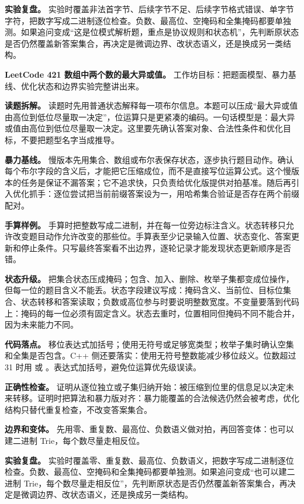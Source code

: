 \textbf{实验复盘。} 实验时覆盖非法首字节、后续字节不足、后续字节格式错误、单字节字符，把数字写成二进制逐位检查。负数、最高位、空掩码和全集掩码都要单独测。如果追问变成“这是位模式解析题，重点是协议规则和状态机”，先判断原状态是否仍然覆盖新答案集合，再决定是微调边界、改状态语义，还是换成另一类结构。

\noindent\textbf{LeetCode 421 数组中两个数的最大异或值。} 工作坊目标：把题面模型、暴力基线、优化状态和边界实验完整讲出来。

\textbf{读题拆解。} 读题时先用普通状态解释每一项布尔信息。本题可以压成“最大异或值由高位到低位尽量取一决定”，位运算只是更紧凑的编码。一句话模型是：最大异或值由高位到低位尽量取一决定。这里要先确认答案对象、合法性条件和优化目标，不要把题型名字当成推导。

\textbf{暴力基线。} 慢版本先用集合、数组或布尔表保存状态，逐步执行题目动作。确认每个布尔字段的含义后，才能把它压缩成位，而不是直接写位运算公式。这个慢版本的任务是保证不漏答案；它不追求快，只负责给优化版提供对拍基准。随后再引入优化抓手：逐位尝试把当前前缀答案设为一，用哈希集合验证是否存在两个前缀配对。

\textbf{手算样例。} 手算时把整数写成二进制，并在每一位旁边标注含义。状态转移只允许改变题目动作允许改变的那些位。手算表至少记录输入位置、状态变化、答案更新和停止条件。只写最终答案看不出边界，逐轮记录才能发现状态更新顺序是否错。

\textbf{状态升级。} 把集合状态压成掩码；包含、加入、删除、枚举子集都变成位操作，但每一位的题目含义不能丢。状态字段建议写成：掩码含义、当前位、目标位集合、状态转移和答案读取；负数或高位参与时要说明整数宽度。不变量要落到代码上：掩码的每一位必须有固定含义。状态去重时，位置相同但掩码不同不能合并，因为未来能力不同。

\textbf{代码落点。} 移位表达式加括号；使用无符号或足够宽类型；枚举子集时确认空集和全集是否包含。C++ 侧还要落实：使用无符号整数能减少移位歧义。位数超过 31 时用  或 。表达式加括号，避免位运算优先级误读。

\textbf{正确性检查。} 证明从逐位独立或子集归纳开始：被压缩到位里的信息足以决定未来转移。证明时把算法和暴力版对齐：暴力能覆盖的合法候选仍然会被考虑，优化结构只替代重复检查，不改变答案集合。

\textbf{边界和变体。} 先用零、重复数、最高位、负数语义做对拍，再回答变体：也可以建二进制 Trie，每个数尽量走相反位。

\textbf{实验复盘。} 实验时覆盖零、重复数、最高位、负数语义，把数字写成二进制逐位检查。负数、最高位、空掩码和全集掩码都要单独测。如果追问变成“也可以建二进制 Trie，每个数尽量走相反位”，先判断原状态是否仍然覆盖新答案集合，再决定是微调边界、改状态语义，还是换成另一类结构。

